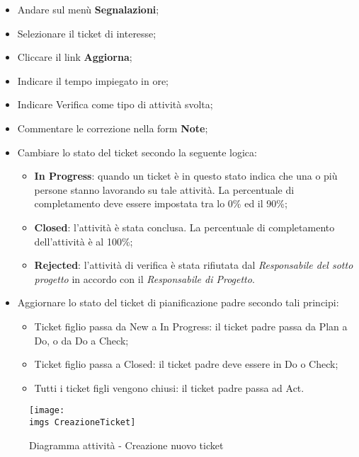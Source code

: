 \begin{itemize}
\item Andare sul menù \textbf{Segnalazioni}; 
\item Selezionare il ticket di interesse; 
\item Cliccare il link \textbf{Aggiorna}; 
\item Indicare il tempo impiegato in ore; 
\item Indicare Verifica come tipo di attività svolta; 
\item Commentare le correzione nella form \textbf{Note}; 
\item Cambiare lo stato del ticket secondo la seguente logica:
		\begin{itemize}
		\item \textbf{In Progress}: quando un ticket è in questo stato indica che una o più persone 
		stanno lavorando su tale attività. La percentuale di completamento deve 
		essere impostata tra lo 0\% ed il 90\%; 
		\item \textbf{Closed}: l’attività è stata conclusa. La percentuale di completamento dell’attività è al 100\%; 
		\item \textbf{Rejected}: l’attività di verifica è stata rifiutata dal \emph{Responsabile del sotto progetto} in accordo con il \emph{Responsabile di Progetto}. 
		
		\end{itemize}

\item Aggiornare lo stato del ticket di pianificazione padre secondo tali principi:
		\begin{itemize}
		\item Ticket figlio passa da New a In Progress: il ticket padre passa da Plan a Do, 
		o da Do a Check; 
		\item Ticket figlio passa a Closed: il ticket padre deve essere in Do o Check; 
		\item Tutti i ticket figli vengono chiusi: il ticket padre passa ad Act. 
		
		\end{itemize} 

\end{itemize} 
\begin{figure}[H]
  \centering
    \texttt{[image: \\imgs CreazioneTicket]}
  \caption{Diagramma attività - Creazione nuovo ticket}
  \label{fig:CreazioneTicket}
\end{figure}


